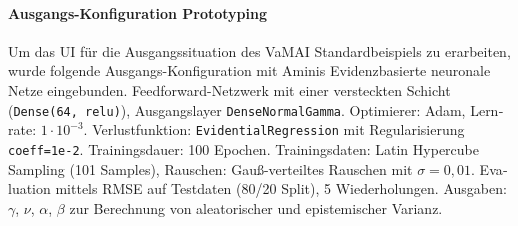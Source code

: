 \begin{otherlanguage}{ngerman}









\paragraph{Ausgangs-Konfiguration \glqq Prototyping \grqq} Um das UI für die Ausgangssituation des VaMAI Standardbeispiels zu erarbeiten, wurde folgende Ausgangs-Konfiguration mit Aminis \gls{Evidenzbasierte neuronale Netze} eingebunden. Feedforward-Netzwerk mit einer versteckten Schicht (\texttt{Dense(64, relu)}), Ausgangslayer \texttt{DenseNormalGamma}. Optimierer: Adam, Lernrate: $1\cdot10^{-3}$. Verlustfunktion: \texttt{EvidentialRegression} mit Regularisierung \texttt{coeff=1e-2}. Trainingsdauer: 100 Epochen. Trainingsdaten: Latin Hypercube Sampling (101 Samples), Rauschen: Gauß-verteiltes Rauschen mit $\sigma = 0{,}01$. Evaluation mittels RMSE auf Testdaten (80/20 Split), 5 Wiederholungen. Ausgaben: $\gamma$, $\nu$, $\alpha$, $\beta$ zur Berechnung von aleatorischer und epistemischer Varianz.


\end{otherlanguage}
